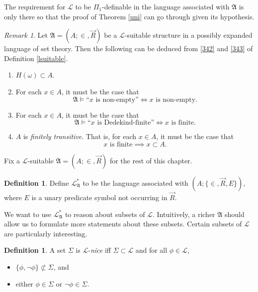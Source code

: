 \documentclass[12pt, twoside]{memoir}
\numberwithin{equation}{section}
\theoremstyle{definition}
\newtheorem{defi}[thm]{Definition}
\theoremstyle{remark}
\newtheorem{rem}[thm]{Remark}
\theoremstyle{definition}
\theoremstyle{definition}
\theoremstyle{definition}
\theoremstyle{remark}
\begin{document}
The requirement for $\mathcal{L}$ to be $\Pi_1$-definable in the language associated with $\mathfrak{A}$ is only there so that the proof of Theorem \ref{uni} can go through given its hypothesis.

\begin{rem}\label{rem35}
Let $\mathfrak{A} = (A; \in, \Vec{R})$ be a $\mathcal{L}$-suitable structure in a possibly expanded language of set theory. Then the following can be deduced from \ref{342} and \ref{343} of Definition \ref{lsuitable}.
\begin{enumerate}[label=(\arabic*)]
    \item\label{351} $H(\omega) \subset A$.
    \item\label{352} For each $x \in A$, it must be the case that
    \begin{equation*}
        \mathfrak{A} \models \text{``} x \text{ is non-empty''} \iff x \text{ is non-empty.}
    \end{equation*}
    \item\label{353} For each $x \in A$, it must be the case that
    \begin{equation*}
        \mathfrak{A} \models \text{``} x \text{ is Dedekind-finite''} \iff x \text{ is finite.}
    \end{equation*}
    \item\label{354} $A$ is \emph{finitely transitive}. That is, for each $x \in A$, it must be the case that
    \begin{equation*}
        x \text{ is finite} \implies x \subset A \text{.}
    \end{equation*}
\end{enumerate}
\end{rem}

Fix a $\mathcal{L}$-suitable $\mathfrak{A} = (A; \in, \Vec{R})$ for the rest of this chapter.

\begin{defi}
Define $\mathcal{L}^{*}_{\mathfrak{A}}$ to be the language associated with $(A; \{\in, \Vec{R}, E\})$, where $E$ is a unary predicate symbol not occurring in $\Vec{R}$. 
\end{defi}

We want to use $\mathcal{L}^{*}_{\mathfrak{A}}$ to reason about subsets of $\mathcal{L}$. Intuitively, a richer $\mathfrak{A}$ should allow us to formulate more statements about these subsets. Certain subsets of $\mathcal{L}$ are particularly interesting.

\begin{defi}\label{lnice}
A set $\Sigma$ is $\mathcal{L}$-\emph{nice} iff $\Sigma \subset \mathcal{L}$ and for all $\phi \in \mathcal{L}$, 
\begin{itemize}
    \item $\{\phi, \neg \phi\} \not\subset \Sigma$, and
    \item either $\phi \in \Sigma$ or $\neg \phi \in \Sigma$.
\end{itemize}
\end{defi}
\end{document}
